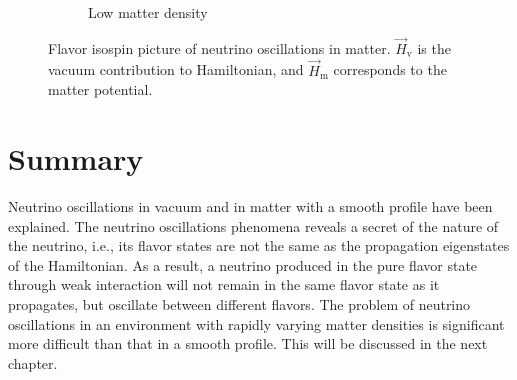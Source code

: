 \begin{figure}[htbp]
\begin{subfigure}[t]{0.3\textwidth}
		\caption{Low matter density}\label{chap:basics-sec:flavor-isospin-pic-fig:msw-adiabatic-small-density}
	\end{subfigure}
	\caption{Flavor isospin picture of neutrino oscillations in matter. $\vec H_{\mathrm v}$ is the vacuum contribution to Hamiltonian, and $\vec H_{\mathrm m}$ corresponds to the matter potential.}\label{chap:basics-sec:flavor-isospin-pic-fig:msw-adiabatic}
\end{figure}






\section{Summary}

Neutrino oscillations in vacuum and in matter with a smooth profile have been explained. The neutrino oscillations phenomena reveals a secret of the nature of the neutrino, i.e., its flavor states are not the same as the propagation eigenstates of the Hamiltonian.
As a result, a neutrino produced in the pure flavor state through weak interaction will not remain in the same flavor state as it propagates, but oscillate between different flavors. The problem of neutrino oscillations in an environment with rapidly varying matter densities is significant more difficult than that in a smooth profile. This will be discussed in the next chapter.
